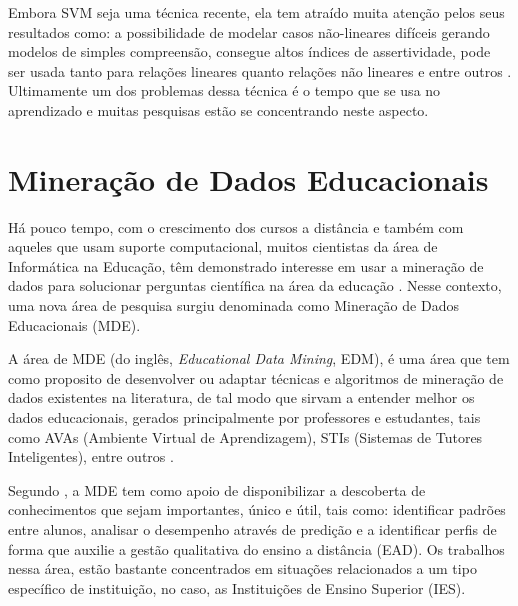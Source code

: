 \par
Embora SVM seja uma técnica recente, ela tem atraído muita atenção pelos seus resultados como: a possibilidade de modelar casos não-lineares difíceis gerando modelos de simples compreensão, consegue altos índices de assertividade, pode ser usada tanto para relações lineares quanto relações não lineares e entre outros \cite{Camilo2009}. Ultimamente um dos problemas dessa técnica é o tempo que se usa no aprendizado e muitas pesquisas estão se concentrando neste aspecto. 





\section{Mineração de Dados Educacionais}

\par
Há pouco tempo, com o crescimento dos cursos a distância e também com aqueles que usam suporte computacional, muitos cientistas da área de Informática na Educação, têm demonstrado interesse em usar a mineração de dados para solucionar perguntas científica na área da educação \cite{Baker2011}. Nesse contexto, uma nova área de pesquisa surgiu denominada como Mineração de Dados Educacionais (MDE).

\par
A área de MDE (do inglês, \textit{Educational Data Mining}, EDM), é uma área que tem como proposito de desenvolver ou adaptar técnicas e algoritmos de mineração de dados existentes na literatura, de tal modo que sirvam a entender melhor os dados educacionais, gerados principalmente por professores e estudantes, tais como AVAs (Ambiente Virtual de Aprendizagem), STIs (Sistemas de Tutores Inteligentes), entre outros \cite{Costa2012, Marques2014}.

\par
Segundo , a MDE tem como apoio de disponibilizar a descoberta de conhecimentos que sejam importantes, único e útil, tais como: identificar padrões entre alunos, analisar o desempenho através de predição e a identificar perfis de forma que auxilie a gestão qualitativa do ensino a distância (EAD). Os trabalhos nessa área, estão bastante concentrados em situações relacionados a um tipo específico de instituição, no caso, as Instituições de Ensino Superior (IES).

\par


